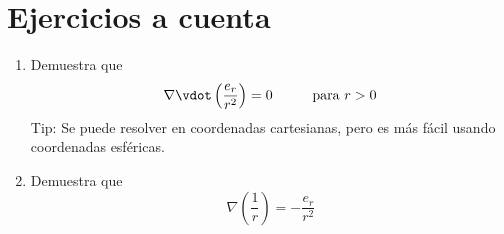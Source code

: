 \section*{Ejercicios a cuenta}
\begin{enumerate}[label=\roman*.]
\item Demuestra que 
\[ \nabla \vdot \left( \dfrac{e_{r}}{r^{2}} \right) = 0 \hspace{1cm} \mbox{para } r > 0 \]
Tip: Se puede resolver en coordenadas cartesianas, pero es más fácil usando coordenadas esféricas.
\item Demuestra que 
\[ \nabla \left( \dfrac{1}{r} \right) = - \dfrac{e_{r}}{r^{2}} \]
\end{enumerate}

